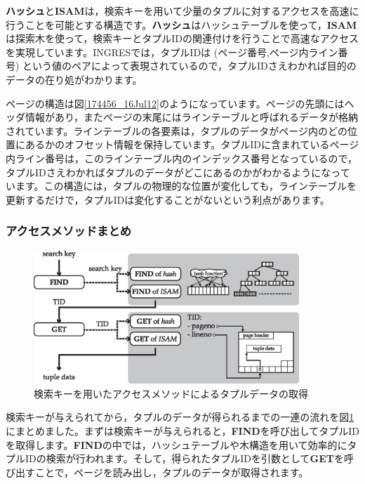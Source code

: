 {\bf ハッシュ}と{\bf ISAM}は，検索キーを用いて少量のタプルに対するアクセスを高速に行うことを可能とする構造です。{\bf ハッシュ}はハッシュテーブルを使って，{\bf ISAM}は探索木を使って，検索キーとタプルIDの関連付けを行うことで高速なアクセスを実現しています。INGRESでは，タプルIDは (ページ番号,ページ内ライン番号) という値のペアによって表現されているので，タプルIDさえわかれば目的のデータの在り処がわかります。


ページの構造は図\ref{174456_16Jul12}のようになっています。ページの先頭にはヘッダ情報があり，またページの末尾にはラインテーブルと呼ばれるデータが格納されています。ラインテーブルの各要素は，タプルのデータがページ内のどの位置にあるかのオフセット情報を保持しています。タプルIDに含まれているページ内ライン番号は，このラインテーブル内のインデックス番号となっているので，タプルIDさえわかればタプルのデータがどこにあるのかがわかるようになっています。この構造には，タプルの物理的な位置が変化しても，ラインテーブルを更新するだけで，タプルIDは変化することがないという利点があります。


\subsubsection{アクセスメソッドまとめ}


\begin{figure}
 \begin{center}
  \includegraphics[width=100mm]{hayamiz/images/access-method.eps}
  \caption{検索キーを用いたアクセスメソッドによるタプルデータの取得}
  \label{190817_16Jul12}
 \end{center}
\end{figure}


検索キーが与えられてから，タプルのデータが得られるまでの一連の流れを図\ref{190817_16Jul12}にまとめました。まずは検索キーが与えられると，{\bf FIND}を呼び出してタプルIDを取得します。{\bf FIND}の中では，ハッシュテーブルや木構造を用いて効率的にタプルIDの検索が行われます。そして，得られたタプルIDを引数として{\bf GET}を呼び出すことで，ページを読み出し，タプルのデータが取得されます。


